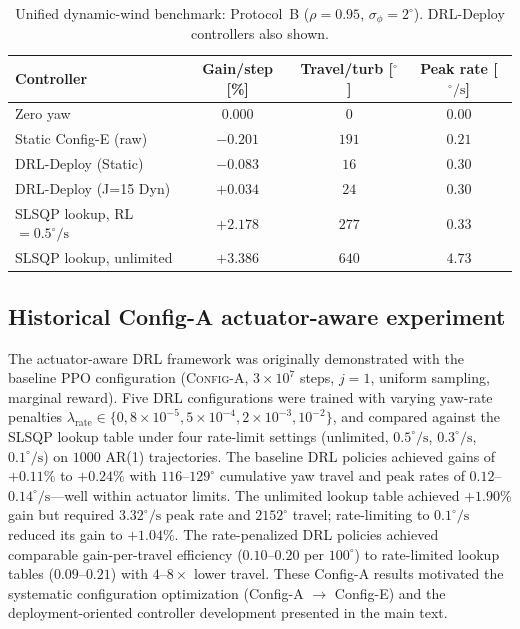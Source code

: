 \documentclass{article}
\begin{document}
\begin{table}[h]
\centering
\caption{Unified dynamic-wind benchmark: Protocol~B ($\rho{=}0.95$, $\sigma_\phi{=}2^\circ$). DRL-Deploy controllers also shown.}
\label{tab:dyn_protoB}
\small
\begin{tabular}{lccc}
\toprule
Controller & Gain/step [\%] & Travel/turb [$^\circ$] & Peak rate [$^\circ\!/\!\mathrm{s}$] \\
\midrule
Zero yaw                      & $0.000$ & $0$    & $0.00$ \\
Static Config-E (raw)         & $-0.201$ & $191$  & $0.21$ \\
DRL-Deploy (Static)           & $-0.083$ & $16$   & $0.30$ \\
DRL-Deploy (J=15 Dyn)         & $+0.034$ & $24$   & $0.30$ \\
SLSQP lookup, RL${=}0.5^\circ\!/\!\mathrm{s}$ & $+2.178$ & $277$  & $0.33$ \\
SLSQP lookup, unlimited       & $+3.386$ & $640$  & $4.73$ \\
\bottomrule
\end{tabular}
\end{table}

\subsection{Historical Config-A actuator-aware experiment}

The actuator-aware DRL framework was originally demonstrated with the baseline PPO configuration (\textsc{Config-A}, $3{\times}10^{7}$ steps, $j{=}1$, uniform sampling, marginal reward). Five DRL configurations were trained with varying yaw-rate penalties $\lambda_\mathrm{rate}\!\in\!\{0,8{\times}10^{-5},5{\times}10^{-4},2{\times}10^{-3},10^{-2}\}$, and compared against the SLSQP lookup table under four rate-limit settings (unlimited, $0.5^\circ\!/\!\mathrm{s}$, $0.3^\circ\!/\!\mathrm{s}$, $0.1^\circ\!/\!\mathrm{s}$) on $1000$ AR(1) trajectories. The baseline DRL policies achieved gains of $+0.11\%$ to $+0.24\%$ with $116$--$129^\circ$ cumulative yaw travel and peak rates of $0.12$--$0.14^\circ\!/\!\mathrm{s}$---well within actuator limits. The unlimited lookup table achieved $+1.90\%$ gain but required $3.32^\circ\!/\!\mathrm{s}$ peak rate and $2152^\circ$ travel; rate-limiting to $0.1^\circ\!/\!\mathrm{s}$ reduced its gain to $+1.04\%$. The rate-penalized DRL policies achieved comparable gain-per-travel efficiency ($0.10$--$0.20$ per $100^\circ$) to rate-limited lookup tables ($0.09$--$0.21$) with $4$--$8{\times}$ lower travel. These Config-A results motivated the systematic configuration optimization (Config-A $\to$ Config-E) and the deployment-oriented controller development presented in the main text.
\end{document}
